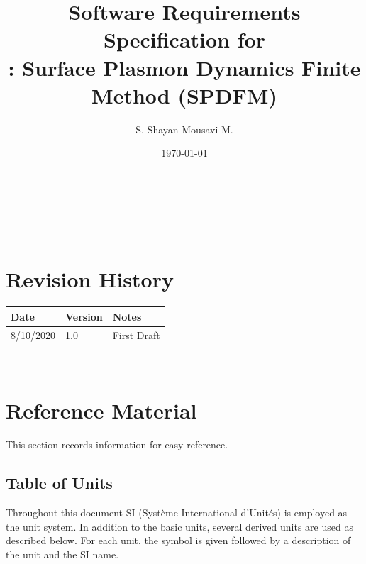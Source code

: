 \documentclass[12pt]{article}
\begin{document}
	
	\title{Software Requirements Specification for\\ \progname: Surface Plasmon
		Dynamics Finite Method (SPDFM)} \author{S. Shayan Mousavi M.} \date{\today}
	
	\maketitle
	
	~\newpage
	
	
	\tableofcontents
	
	~\newpage
	
	\section*{Revision History}
	
	\begin{tabularx}{\textwidth}{p{3cm}p{2cm}X} \toprule {\bf Date} & {\bf Version}
		& {\bf Notes}\\ \midrule 8/10/2020 & 1.0 & First Draft\\ %
		\bottomrule \end{tabularx}
	
	~\newpage
	
	\section{Reference Material}
	
	This section records information for easy reference.
	
	\subsection{Table of Units}
	
	Throughout this document SI (Syst\`{e}me International d'Unit\'{e}s) is employed
	as the unit system.  In addition to the basic units, several derived units are
	used as described below.  For each unit, the symbol is given followed by a
	description of the unit and the SI name. ~\newline
	
\end{document}
